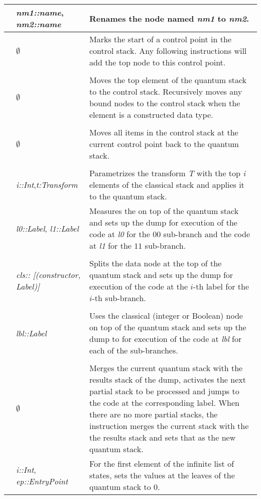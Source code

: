 {\begin{singlespace}
\begin{supertabular}{|p{.8in}|p{1.2in}|p{3.5in}|}
&\emph{nm1::name}, \emph{nm2::name}&Renames 
the node named \emph{nm1} to 
\emph{nm2}.\\
\hline
{}&$\emptyset$&Marks  the start
of a control point in the control stack. Any following  
instructions will add the top node to this control point.\\ & & \\
&$\emptyset$&Moves the top element of the quantum stack
to the control stack. Recursively moves any bound nodes to the control
stack when the element is 
a constructed data type.\\ & & \\
&$\emptyset$&Moves all items in the  control stack at the
current control point back to the quantum stack.\\ & & \\
&\emph{i::Int},\emph{t:Transform}&Parametrizes the transform \emph{T} with
the top \emph{i} elements of the classical stack and applies it to the
 quantum stack.\\
\hline
{}&\emph{l0::Label}, \emph{l1::Label}&Measures 
the \qbit{} on top of the
quantum stack and sets up the dump for execution of
 the code at \emph{l0} for the $00$ sub-branch and 
the code at \emph{l1} for the $11$ sub-branch.\\ & & \\
&\emph{cls:: [(constructor, Label)]}&Splits the data node at 
the top of the
quantum stack and sets up the dump  for execution of the code at 
the $i$-th label for the $i$-th  sub-branch.\\ & & \\
&\emph{lbl::Label}&Uses the classical 
(integer or Boolean) node on top of the
quantum stack and sets up the dump to for execution of the code at 
\emph{lbl} for each of the sub-branches.\\ & & \\
&$\emptyset$&Merges the current quantum stack
 with the results stack of the
dump, activates the next partial stack to be processed
 and jumps to the code at the corresponding 
label. When there are no more partial stacks, the instruction 
merges the current
stack with the the results stack and sets that as the new quantum stack.\\
\hline
{}&\emph{i::Int}, \emph{ep::EntryPoint}&For the first element of the 
infinite list of states, sets the values at the leaves of the 
quantum stack to $0$. 

\end{supertabular}
\end{singlespace}}
